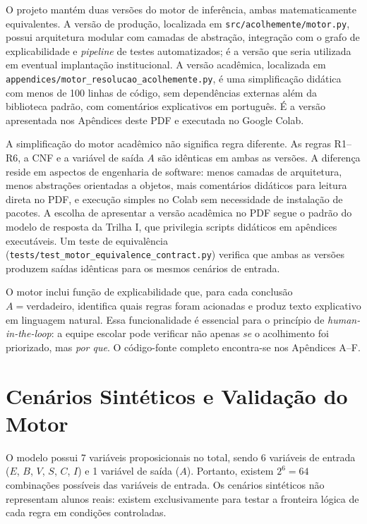 \documentclass[
    12pt,
    openright,
    oneside,
    a4paper,
    english,
    brazil
]{abntex2}
\begin{document}
O projeto mant\'em duas vers\~oes do motor de infer\^encia, ambas matematicamente equivalentes. A vers\~ao de produ\c{c}\~ao, localizada em \texttt{src/acolhemente/motor.py}, possui arquitetura modular com camadas de abstra\c{c}\~ao, integra\c{c}\~ao com o grafo de explicabilidade e \textit{pipeline} de testes automatizados; \'e a vers\~ao que seria utilizada em eventual implanta\c{c}\~ao institucional. A vers\~ao acad\^emica, localizada em \texttt{appendices/motor\_resolucao\_acolhemente.py}, \'e uma simplifica\c{c}\~ao did\'atica com menos de 100 linhas de c\'odigo, sem depend\^encias externas al\'em da biblioteca padr\~ao, com coment\'arios explicativos em portugu\^es. \'E a vers\~ao apresentada nos Ap\^endices deste PDF e executada no Google Colab.

A simplifica\c{c}\~ao do motor acad\^emico n\~ao significa regra diferente. As regras R1--R6, a CNF e a vari\'avel de sa\'ida $A$ s\~ao id\^enticas em ambas as vers\~oes. A diferen\c{c}a reside em aspectos de engenharia de software: menos camadas de arquitetura, menos abstra\c{c}\~oes orientadas a objetos, mais coment\'arios did\'aticos para leitura direta no PDF, e execu\c{c}\~ao simples no Colab sem necessidade de instala\c{c}\~ao de pacotes. A escolha de apresentar a vers\~ao acad\^emica no PDF segue o padr\~ao do modelo de resposta da Trilha I, que privilegia scripts did\'aticos em ap\^endices execut\'aveis. Um teste de equival\^encia (\texttt{tests/test\_motor\_equivalence\_contract.py}) verifica que ambas as vers\~oes produzem sa\'idas id\^enticas para os mesmos cen\'arios de entrada.

O motor inclui fun\c{c}\~ao de explicabilidade que, para cada conclus\~ao $A = \text{verdadeiro}$, identifica quais regras foram acionadas e produz texto explicativo em linguagem natural. Essa funcionalidade \'e essencial para o princ\'ipio de \textit{human-in-the-loop}: a equipe escolar pode verificar n\~ao apenas \textit{se} o acolhimento foi priorizado, mas \textit{por que}. O c\'odigo-fonte completo encontra-se nos Ap\^endices A--F.

\chapter{Cen\'arios Sint\'eticos e Valida\c{c}\~ao do Motor}

O modelo possui 7 vari\'aveis proposicionais no total, sendo 6 vari\'aveis de entrada ($E$, $B$, $V$, $S$, $C$, $I$) e 1 vari\'avel de sa\'ida ($A$). Portanto, existem $2^6 = 64$ combina\c{c}\~oes poss\'iveis das vari\'aveis de entrada. Os cen\'arios sint\'eticos n\~ao representam alunos reais: existem exclusivamente para testar a fronteira l\'ogica de cada regra em condi\c{c}\~oes controladas.
\end{document}
